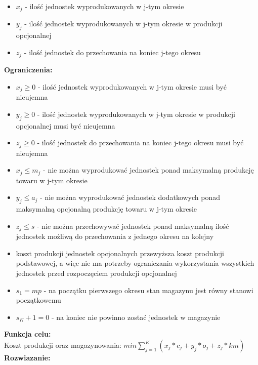 \documentclass[15pt, a4paper]{article}
\begin{document}
\begin{itemize}
    \item \( x_j \) - ilość jednostek wyprodukowanych w j-tym okresie
    \item \( y_j \) - ilość jednostek wyprodukowanych w j-tym okresie w produkcji opcjonalnej
    \item \( z_j \) - ilość jednostek do przechowania na koniec j-tego okresu
\end{itemize}

\noindent\textbf{Ograniczenia:}

\begin{itemize}
    \item \(x_{j} \geq 0 \) - ilość jednostek wyprodukowanych w j-tym okresie musi być nieujemna
    \item \(y_{j} \geq 0 \) - ilość jednostek wyprodukowanych w j-tym okresie w produkcji opcjonalnej musi być nieujemna
    \item \(z_{j} \geq 0 \) - ilość jednostek do przechowania na koniec j-tego okresu musi być nieujemna
    \item \( x_{j} \leq m_j \) - nie można wyprodukować jednostek ponad maksymalną produkcję towaru w j-tym okresie     
    \item \( y_{j} \leq a_j\) - nie można wyprodukować jednostek dodatkowych ponad maksymalną opcjonalną produkcję towaru w j-tym okresie     
    \item \( z_j \leq s \) - nie można przechowywać jednostek ponad maksymalną ilość jednostek możliwą do przechowania z jednego okresu na kolejny
    \item koszt produkcji jednostek opcjonalnych przewyższa koszt produkcji podstawowej, a więc nie ma potrzeby ograniczania wykorzystania wszystkich jednostek przed rozpoczęciem produkcji opcjonalnej
    \item \( s_1 = mp \) - na początku pierwszego okresu stan magazynu jest równy stanowi początkowemu 
    \item \( s_K+1 = 0 \) - na koniec nie powinno zostać jednostek w magazynie
\end{itemize}

\noindent\textbf{Funkcja celu:}\\

Koszt produkcji oraz magazynowania: \(min \sum_{j=1}^{K}(x_{j} * c_{j} + y_{j} * o_{j} + z_{j} * km)\)\\

\noindent\textbf{Rozwiazanie:}\\ 
\end{document}
